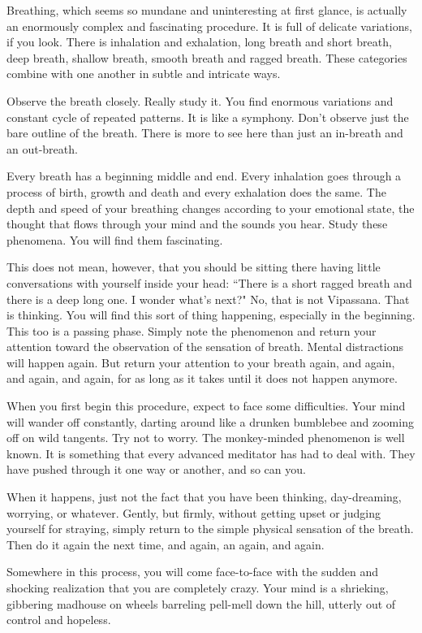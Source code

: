 Breathing, which seems so mundane and uninteresting at first glance, is actually
an enormously complex and fascinating procedure. It is full of delicate
variations, if you look. There is inhalation and exhalation, long breath and
short breath, deep breath, shallow breath, smooth breath and ragged breath.
These categories combine with one another in subtle and intricate ways.

Observe the breath closely. Really study it. You find enormous variations and
constant cycle of repeated patterns. It is like a symphony. Don't observe just
the bare outline of the breath. There is more to see here than just an in-breath
and an out-breath.

Every breath has a beginning middle and end. Every inhalation goes through a
process of birth, growth and death and every exhalation does the same. The depth
and speed of your breathing changes according to your emotional state, the
thought that flows through your mind and the sounds you hear. Study these
phenomena. You will find them fascinating.

This does not mean, however, that you should be sitting there having little
conversations with yourself inside your head: ``There is a short ragged breath
and there is a deep long one. I wonder what's next?" No, that is not Vipassana.
That is thinking. You will find this sort of thing happening, especially in the
beginning. This too is a passing phase. Simply note the phenomenon and return
your attention toward the observation of the sensation of breath. Mental
distractions will happen again. But return your attention to your breath again,
and again, and again, and again, for as long as it takes until it does not
happen anymore.

When you first begin this procedure, expect to face some difficulties. Your mind
will wander off constantly, darting around like a drunken bumblebee and zooming
off on wild tangents. Try not to worry. The monkey-minded phenomenon is well
known. It is something that every advanced meditator has had to deal with. They
have pushed through it one way or another, and so can you.

When it happens, just not the fact that you have been thinking, day-dreaming,
worrying, or whatever. Gently, but firmly, without getting upset or judging
yourself for straying, simply return to the simple physical sensation of the
breath. Then do it again the next time, and again, an again, and again.

Somewhere in this process, you will come face-to-face with the sudden and
shocking realization that you are completely crazy.  Your mind is a shrieking,
gibbering madhouse on wheels barreling pell-mell down the hill, utterly out of
control and hopeless.

